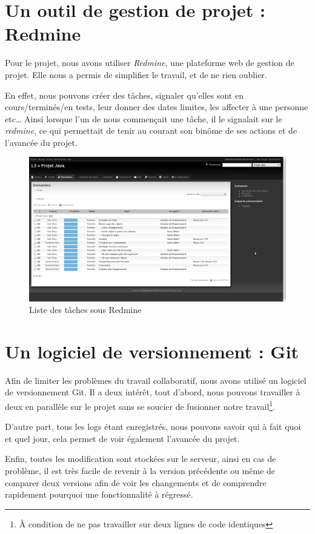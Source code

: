 \documentclass[12pt,a4paper,openany]{book}
\begin{document}
	\section{Un outil de gestion de projet : Redmine}
	Pour le projet, nous avons utiliser \textit{Redmine}, une plateforme web de gestion de projet. Elle nous a permis de simplifier le travail, et
	de ne rien oublier.

	En effet, nous pouvons créer des tâches, signaler qu'elles sont en cours/terminés/en tests, leur donner des dates limites, les affecter à une personne etc\ldots
	Ainsi lorsque l'un de nous commençait une tâche, il le signalait sur le \textit{redmine}, ce qui permettait de tenir au courant son binôme de ses actions et
	de l'avancée du projet.
	\begin{figure}[H]
		\centering
		\includegraphics[width=18cm]{screens/redmine.png}
		\caption{Liste des tâches sous Redmine}
	\end{figure}

	\section{Un logiciel de versionnement : Git}
	Afin de limiter les problèmes du travail collaboratif, nous avons utilisé un logiciel de versionnement Git. Il a deux intérêt, tout d'abord, nous pouvons
	travailler à deux en parallèle sur le projet sans se soucier de fusionner notre travail\footnote{À condition de ne pas travailler sur deux lignes de code
	identiques}.

	D'autre part, tous les logs étant enregistrés, nous pouvons savoir qui à fait quoi et quel jour, cela permet de voir également l'avancée du projet. 

	Enfin, toutes les modification sont stockées sur le serveur, ainsi en cas de problème, il est très facile de revenir à la version précédente ou même de
	comparer deux versions afin de voir les changements et de comprendre rapidement pourquoi une fonctionnalité à régressé. 
\end{document}
